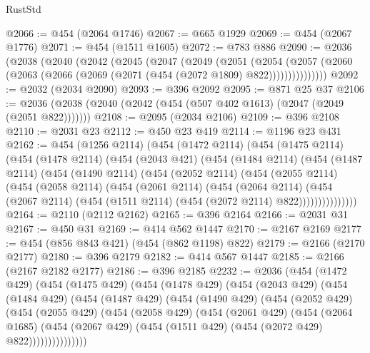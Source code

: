 \begin{lexlean}{RustStd}
\begin{coremodule}
@2066 := @454 (@2064 @1746)
@2067 := @665 @1929
@2069 := @454 (@2067 @1776)
@2071 := @454 (@1511 @1605)
@2072 := @783 @886
@2090 := @2036
    (@2038
      (@2040
        (@2042
          (@2045
            (@2047
              (@2049
                (@2051
                  (@2054
                    (@2057
                      (@2060 (@2063 (@2066 (@2069 (@2071 (@454 (@2072 @1809) @822)))))))))))))))
@2092 := @2032 (@2034 @2090)
@2093 := @396 @2092
@2095 := @871 @25 @37
@2106 := @2036 (@2038 (@2040 (@2042 (@454 (@507 @402 @1613) (@2047 (@2049 (@2051 @822)))))))
@2108 := @2095 (@2034 @2106)
@2109 := @396 @2108
@2110 := @2031 @23
@2112 := @450 @23 @419
@2114 := @1196 @23 @431
@2162 := @454
    (@1256 @2114)
    (@454
      (@1472 @2114)
      (@454
        (@1475 @2114)
        (@454
          (@1478 @2114)
          (@454
            (@2043 @421)
            (@454
              (@1484 @2114)
              (@454
                (@1487 @2114)
                (@454
                  (@1490 @2114)
                  (@454
                    (@2052 @2114)
                    (@454
                      (@2055 @2114)
                      (@454
                        (@2058 @2114)
                        (@454
                          (@2061 @2114)
                          (@454
                            (@2064 @2114)
                            (@454
                              (@2067 @2114)
                              (@454 (@1511 @2114) (@454 (@2072 @2114) @822)))))))))))))))
@2164 := @2110 (@2112 @2162)
@2165 := @396 @2164
@2166 := @2031 @31
@2167 := @450 @31
@2169 := @414 @562 @1447
@2170 := @2167 @2169
@2177 := @454 (@856 @843 @421) (@454 (@862 @1198) @822)
@2179 := @2166 (@2170 @2177)
@2180 := @396 @2179
@2182 := @414 @567 @1447
@2185 := @2166 (@2167 @2182 @2177)
@2186 := @396 @2185
@2232 := @2036
    (@454
      (@1472 @429)
      (@454
        (@1475 @429)
        (@454
          (@1478 @429)
          (@454
            (@2043 @429)
            (@454
              (@1484 @429)
              (@454
                (@1487 @429)
                (@454
                  (@1490 @429)
                  (@454
                    (@2052 @429)
                    (@454
                      (@2055 @429)
                      (@454
                        (@2058 @429)
                        (@454
                          (@2061 @429)
                          (@454
                            (@2064 @1685)
                            (@454
                              (@2067 @429)
                              (@454 (@1511 @429) (@454 (@2072 @429) @822)))))))))))))))

\end{coremodule}
\end{lexlean}
